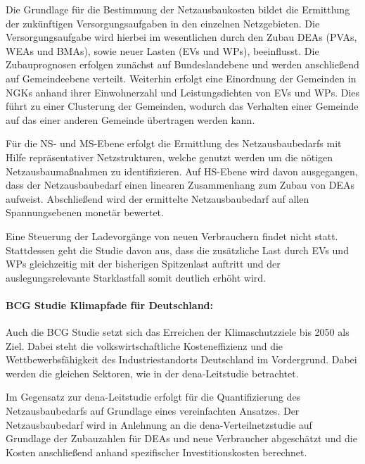 Die Grundlage für die Bestimmung der Netzausbaukosten bildet die Ermittlung der zukünftigen Versorgungsaufgaben in den einzelnen Netzgebieten.
Die Versorgungsaufgabe wird hierbei im wesentlichen durch den Zubau \glspl{DEA} (\glspl{PVA}, \glspl{WEA} und \glspl{BMA}), sowie neuer Lasten (\glspl{EV} und \glspl{WP}), beeinflusst.
Die Zubauprognosen erfolgen zunächst auf Bundeslandebene und werden anschließend auf Gemeindeebene verteilt.
Weiterhin erfolgt eine Einordnung der Gemeinden in \glspl{NGK} anhand ihrer Einwohnerzahl und Leistungsdichten von \glspl{EV} und \glspl{WP}.
Dies führt zu einer Clusterung der Gemeinden, wodurch das Verhalten einer Gemeinde auf das einer anderen Gemeinde übertragen werden kann.\medskip

Für die \gls{NS}- und \gls{MS}-Ebene erfolgt die Ermittlung des Netzausbaubedarfs mit Hilfe repräsentativer Netzstrukturen, welche genutzt werden um die nötigen Netzausbaumaßnahmen zu identifizieren.
Auf \gls{HS}-Ebene wird davon ausgegangen, dass der Netzausbaubedarf einen linearen Zusammenhang zum Zubau von \glspl{DEA} aufweist.
Abschließend wird der ermittelte Netzausbaubedarf auf allen Spannungsebenen monetär bewertet.\medskip

Eine Steuerung der Ladevorgänge von neuen Verbrauchern findet nicht statt.
Stattdessen geht die Studie davon aus, dass die zusätzliche Last durch \glspl{EV} und \glspl{WP} gleichzeitig mit der bisherigen Spitzenlast auftritt und der auslegungsrelevante Starklastfall somit deutlich erhöht wird.

\paragraph{BCG Studie \glqq Klimapfade für Deutschland\grqq{}:}

Auch die BCG Studie setzt sich das Erreichen der Klimaschutzziele bis \num{2050} als Ziel.
Dabei steht die volkswirtschaftliche Kosteneffizienz und die Wettbewerbsfähigkeit des Industriestandorts Deutschland im Vordergrund.
Dabei werden die gleichen Sektoren, wie in der dena-Leitstudie betrachtet. \medskip

Im Gegensatz zur dena-Leitstudie erfolgt für die Quantifizierung des Netzausbaubedarfs auf Grundlage eines vereinfachten Ansatzes.
Der Netzausbaubedarf wird in Anlehnung an die dena-Verteilnetzstudie \cite{DEAGH2012} auf Grundlage der Zubauzahlen für \glspl{DEA} und neue Verbraucher abgeschätzt und die Kosten anschließend anhand spezifischer Investitionskosten berechnet. 

